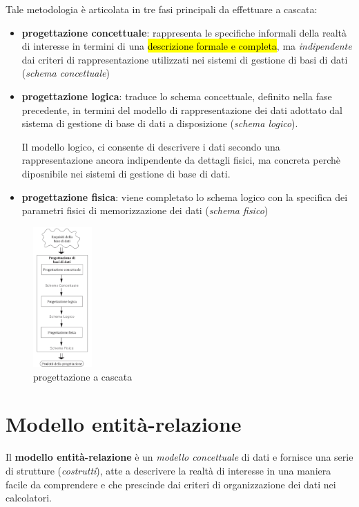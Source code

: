 \documentclass[a4paper, 12pt]{book}
\begin{document}
    Tale metodologia è articolata in tre fasi principali da effettuare a cascata:
    \begin{itemize}
      \item \textbf{progettazione concettuale}: rappresenta le specifiche informali della realtà di interesse in termini di una \hl{descrizione formale e completa}, ma \textit{indipendente} dai criteri di rappresentazione utilizzati nei sistemi di gestione di basi di dati (\textit{schema concettuale}) 
      \item \textbf{progettazione logica}: traduce lo schema concettuale, definito nella fase precedente, in termini del modello di rappresentazione dei dati adottato dal sistema di gestione di base di dati a disposizione (\textit{schema logico}).
      
      Il modello logico, ci consente di descrivere i dati secondo una rappresentazione ancora indipendente da dettagli fisici, ma concreta perchè diposnibile nei sistemi di gestione di base di dati.
      
      \item \textbf{progettazione fisica}: viene completato lo schema logico con la specifica dei parametri fisici di memorizzazione dei dati (\textit{schema fisico})
    \end{itemize}

    \begin{figure}[H]
      \centering
      \includegraphics[width=0.2\textwidth, keepaspectratio]{images/progettazioneACascata.jpeg}
      \caption{progettazione a cascata}
    \end{figure}

    \section*{Modello entità-relazione}
    Il \textbf{modello entità-relazione} è un \textit{modello concettuale} di dati e fornisce una serie di strutture (\textit{costrutti}), atte a descrivere la realtà di interesse in una maniera facile da comprendere e che prescinde dai criteri di organizzazione dei dati nei calcolatori.
\end{document}
